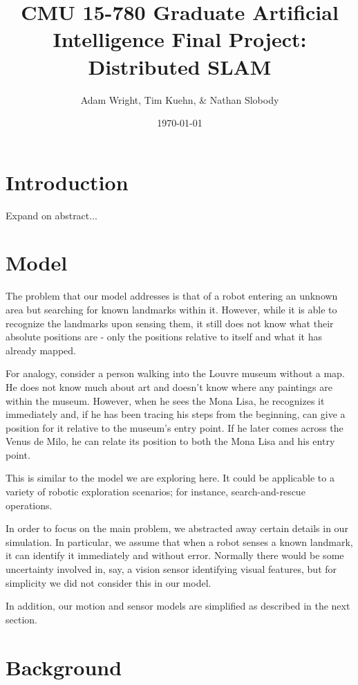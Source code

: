 \documentclass[prodmode,acmtecs]{acmsmall} %
\title{
    CMU 15-780 Graduate Artificial Intelligence
    Final Project: Distributed SLAM
}
\author{
    Adam Wright, Tim Kuehn, \& Nathan Slobody \\
}
\date{\today}
\begin{document}
\maketitle

\setcounter{tocdepth}{2}

\section{Introduction}

Expand on abstract...

\section{Model}

The problem that our model addresses is that of a robot entering an unknown area but searching for known landmarks within it.  However, while it is able to recognize the landmarks upon sensing them, it still does not know what their absolute positions are - only the positions relative to itself and what it has already mapped.

For analogy, consider a person walking into the Louvre museum without a map.  He does not know much about art and doesn't know where any paintings are within the museum.  However, when he sees the Mona Lisa, he recognizes it immediately and, if he has been tracing his steps from the beginning, can give a position for it relative to the museum's entry point.  If he later comes across the Venus de Milo, he can relate its position to both the Mona Lisa and his entry point.

This is similar to the model we are exploring here.  It could be applicable to a variety of robotic exploration scenarios; for instance, search-and-rescue operations.

In order to focus on the main problem, we abstracted away certain details in our simulation.  In particular, we assume that when a robot senses a known landmark, it can identify it immediately and without error.  Normally there would be some uncertainty involved in, say, a vision sensor identifying visual features, but for simplicity we did not consider this in our model.

In addition, our motion and sensor models are simplified as described in the next section.

\section{Background}
\end{document}
